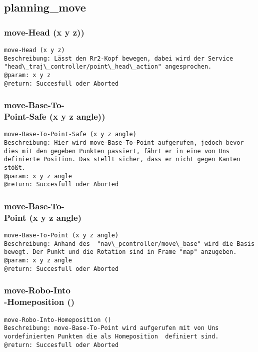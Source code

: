 \documentclass{suturo}
\begin{document}
\subsection{planning\_move}

\subsubsection{move-Head (x y z))
}
\begin{verbatim}
move-Head (x y z)
Beschreibung: Lässt den Rr2-Kopf bewegen, dabei wird der Service "head\_traj\_controller/point\_head\_action" angesprochen.
@param: x y z 
@return: Succesfull oder Aborted
\end{verbatim}



\subsubsection{move-Base-To-\\
Point-Safe (x y z angle))
}
\begin{verbatim}
move-Base-To-Point-Safe (x y z angle)
Beschreibung: Hier wird move-Base-To-Point aufgerufen, jedoch bevor dies mit den gegeben Punkten passiert, fährt er in eine von Uns definierte Position. Das stellt sicher, dass er nicht gegen Kanten stößt. 
@param: x y z angle
@return: Succesfull oder Aborted
\end{verbatim}


\subsubsection{move-Base-To-\\
Point (x y z angle)}
\begin{verbatim}
move-Base-To-Point (x y z angle)
Beschreibung: Anhand des  "nav\_pcontroller/move\_base" wird die Basis bewegt. Der Punkt und die Rotation sind in Frame "map" anzugeben.
@param: x y z angle
@return: Succesfull oder Aborted
\end{verbatim}




\subsubsection{move-Robo-Into\\
-Homeposition ()}
\begin{verbatim}
move-Robo-Into-Homeposition ()
Beschreibung: move-Base-To-Point wird aufgerufen mit von Uns vordefinierten Punkten die als Homeposition  definiert sind.
@return: Succesfull oder Aborted
\end{verbatim}
\end{document}
